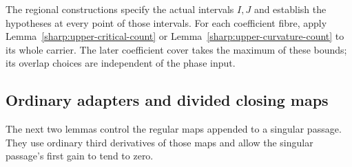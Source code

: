 The regional constructions specify the actual intervals \(I,J\) and
establish the hypotheses at every point of those intervals. For each
coefficient fibre, apply Lemma~\ref{sharp:upper-critical-count} or
Lemma~\ref{sharp:upper-curvature-count} to its whole carrier. The later
coefficient cover takes the maximum of these bounds; its overlap choices
are independent of the phase input.

\subsection{Ordinary adapters and divided closing maps}

The next two lemmas control the regular maps appended to a singular
passage. They use ordinary third derivatives of those maps and allow the
singular passage's first gain to tend to zero.

